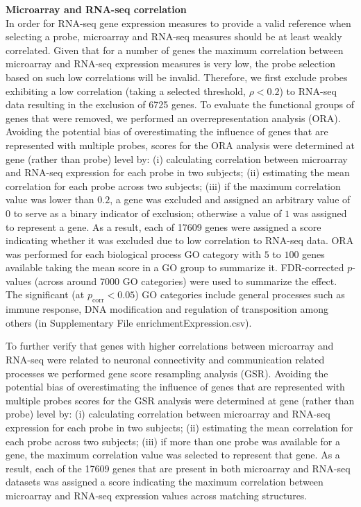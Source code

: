 \textbf{Microarray and RNA-seq correlation}\\
In order for RNA-seq gene expression measures to provide a valid reference when selecting a probe, microarray and RNA-seq measures should be at least weakly correlated. Given that for a number of genes the maximum correlation between microarray and RNA-seq expression measures is very low, the probe selection based on such low correlations will be invalid. Therefore, we first exclude probes exhibiting a low correlation (taking a selected threshold, $\rho < 0.2$) to RNA-seq data resulting in the exclusion of \num{6725} genes. To evaluate the functional groups of genes that were removed, we performed an overrepresentation analysis (ORA). Avoiding the potential bias of overestimating the influence of genes that are represented with multiple probes, scores for the ORA analysis were determined at gene (rather than probe) level by: (i) calculating correlation between microarray and RNA-seq expression for each probe in two subjects; (ii) estimating the mean correlation for each probe across two subjects; (iii) if the maximum correlation value was lower than $0.2$, a gene was excluded and assigned an arbitrary value of $0$ to serve as a binary indicator of exclusion; otherwise a value of $1$ was assigned to represent a gene. As a result, each of \num{17609} genes were assigned a score indicating whether it was excluded due to low correlation to RNA-seq data. ORA was performed for each biological process GO category with $5$ to $100$ genes available taking the mean score in a GO group to summarize it. FDR-corrected $p$-values (across around \num{7000} GO categories) were used to summarize the effect. The significant (at $p_\mathrm{corr}<0.05$) GO categories include general processes such as immune response, DNA modification and regulation of transposition among others (in Supplementary File enrichmentExpression.csv).

To further verify that genes with higher correlations between microarray and RNA-seq were related to neuronal connectivity and communication related processes we performed gene score resampling analysis (GSR). Avoiding the potential bias of overestimating the influence of genes that are represented with multiple probes scores for the GSR analysis were determined at gene (rather than probe) level by: (i) calculating correlation between microarray and RNA-seq expression for each probe in two subjects; (ii) estimating the mean correlation for each probe across two subjects; (iii) if more than one probe was available for a gene, the maximum correlation value was selected to represent that gene. As a result, each of the \num{17609} genes that are present in both microarray and RNA-seq datasets was assigned a score indicating the maximum correlation between microarray and RNA-seq expression values across matching structures.

